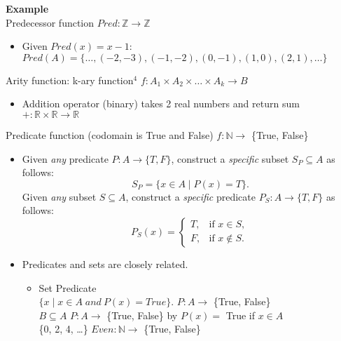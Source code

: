 \documentclass{article}
\begin{document}
\textbf{Example} \\
Predecessor function \hfill $Pred: \mathbb{Z} \to \mathbb{Z} $ 
\begin{itemize}[itemsep=0pt] 
    \renewcommand{\labelitemi}{} %
    \footnotesize %
    \item Given $Pred(x) = x - 1$: $Pred(A) = \{ \ldots, (-2, -3), (-1, -2), (0, -1), (1, 0), (2, 1), \ldots \} $ 
\end{itemize}
Arity function: k-ary function$^4$ \hfill $f : A_1 \times A_2 \times \ldots \times A_k \to B$ 
\begin{itemize}[itemsep=0pt] 
    \renewcommand{\labelitemi}{} %
    \footnotesize %
    \item Addition operator (binary) takes 2 real numbers and return sum \hfill $ + : \mathbb{R} \times \mathbb{R} \to \mathbb{R} $ 
\end{itemize}
Predicate function (codomain is True and False) \hfill $ f : \mathbb{N} \to $ \{True, False\}
\begin{itemize}[itemsep=0pt] 
    \renewcommand{\labelitemi}{} %
    \footnotesize %
    \item Given \emph{any} predicate $P: A \to \{T, F\}$, construct a \emph{specific} subset $S_P \subseteq A$ 
        as follows: \[ S_P = \{x \in A \mid P(x) = T\}. \]
    Given \emph{any} subset $S \subseteq A$, construct a \emph{specific} predicate $P_S: A \to \{T, F\}$ as follows: \[
    P_S(x) =
        \begin{cases}
            T, & \text{if } x \in S, \\
            F, & \text{if } x \notin S.
        \end{cases} \]
    \item Predicates and sets are closely related.
    \begin{itemize}[itemsep=0pt] 
        \renewcommand{\labelitemi}{} %
        \footnotesize %
        \item[] Set \hfill Predicate \\
        $\{ x \mid x \in A \; and \:P(x) = True\}$. \hfill $ P : A \to$ \{True, False\} \\
        $B \subseteq A$ \hfill $P : A \to $ \{True, False\} by $P(x) = $ True if $x \in A$ \\
        \{0, 2, 4, \ldots \} \hfill  $ Even : \mathbb{N} \to $ \{True, False\}
    \end{itemize}

\end{itemize}
\end{document}
